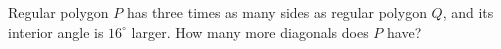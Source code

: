 Regular polygon $P$ has three times as many sides as regular polygon $Q$, and its interior angle is $16^\circ$ larger. How many more diagonals does $P$ have?
